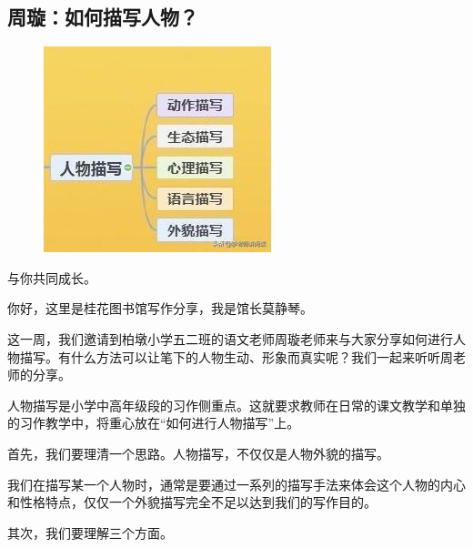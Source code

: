 \vspace{10pt}

{\centering\subsection*{周璇：如何描写人物？}}


\renewcommand{\leftmark}{周璇：如何描写人物？}

\begin{figure}[htbp]

\centering

\includegraphics[width = .5\textwidth]{./ch/v4.jpg}

\end{figure}


与你共同成长。



你好，这里是桂花图书馆写作分享，我是馆长莫静琴。



这一周，我们邀请到柏墩小学五二班的语文老师周璇老师来与大家分享如何进行人物描写。有什么方法可以让笔下的人物生动、形象而真实呢？我们一起来听听周老师的分享。





人物描写是小学中高年级段的习作侧重点。这就要求教师在日常的课文教学和单独的习作教学中，将重心放在“如何进行人物描写”上。



首先，我们要理清一个思路。人物描写，不仅仅是人物外貌的描写。



我们在描写某一个人物时，通常是要通过一系列的描写手法来体会这个人物的内心和性格特点，仅仅一个外貌描写完全不足以达到我们的写作目的。



其次，我们要理解三个方面。



